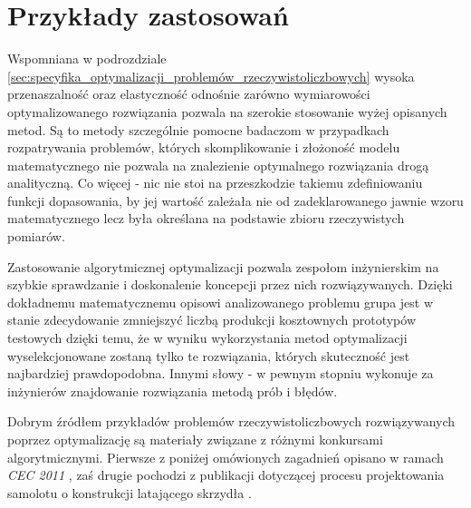 \section{Przykłady zastosowań}
\par
Wspomniana w podrozdziale \ref{sec:specyfika_optymalizacji_problemów_rzeczywistoliczbowych} wysoka przenaszalność oraz elastyczność odnośnie zarówno wymiarowości optymalizowanego rozwiązania pozwala na szerokie stosowanie wyżej opisanych metod. Są to metody szczególnie pomocne badaczom w przypadkach rozpatrywania problemów, których skomplikowanie i złożoność modelu matematycznego nie pozwala na znalezienie optymalnego rozwiązania drogą analityczną. Co więcej - nic nie stoi na przeszkodzie takiemu zdefiniowaniu funkcji dopasowania, by jej wartość zależała nie od zadeklarowanego jawnie wzoru matematycznego lecz była określana na podstawie zbioru rzeczywistych pomiarów. 
\par
Zastosowanie algorytmicznej optymalizacji pozwala zespołom inżynierskim na szybkie sprawdzanie i doskonalenie koncepcji przez nich rozwiązywanych. Dzięki dokładnemu matematycznemu opisowi analizowanego problemu grupa jest w stanie zdecydowanie zmniejszyć liczbą produkcji kosztownych prototypów testowych dzięki temu, że w wyniku wykorzystania metod optymalizacji wyselekcjonowane zostaną tylko te rozwiązania, których skuteczność jest najbardziej prawdopodobna. Innymi słowy - w pewnym stopniu wykonuje za inżynierów znajdowanie rozwiązania metodą prób i błędów. 
\par
Dobrym źródłem przykładów problemów rzeczywistoliczbowych rozwiązywanych poprzez optymalizację są materiały związane z różnymi konkursami algorytmicznymi. Pierwsze z poniżej omówionych zagadnień opisano w ramach \emph{CEC 2011} \cite{cec2011}, zaś drugie pochodzi z publikacji dotyczącej procesu projektowania samolotu o konstrukcji latającego skrzydła \cite{lee2007multi}.
